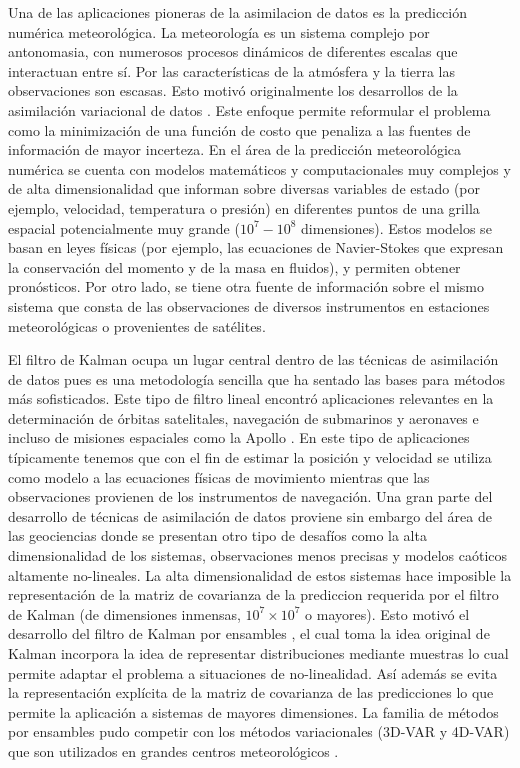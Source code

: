 Una de las aplicaciones pioneras de la asimilacion de datos es la predicción numérica meteorológica. La meteorología es un sistema complejo por antonomasia, con numerosos procesos dinámicos de diferentes escalas que interactuan entre sí. Por las características de la atmósfera y la tierra las observaciones son escasas. Esto motivó originalmente los desarrollos de la asimilación variacional de datos \citep{Talagrand1987}. Este enfoque permite reformular el problema como la minimización de una función de costo que penaliza a las fuentes de información de mayor incerteza. En el área de la predicción meteorológica numérica se cuenta con modelos matemáticos y computacionales muy complejos y de alta dimensionalidad que informan sobre diversas variables de estado (por ejemplo, velocidad, temperatura o presión) en diferentes puntos de una grilla espacial potencialmente muy grande ($10^7 - 10^8$ dimensiones). Estos modelos se basan en leyes físicas (por ejemplo, las ecuaciones de Navier-Stokes que expresan la conservación del momento y de la masa en fluidos), y permiten obtener pronósticos. Por otro lado, se tiene otra fuente de información sobre el mismo sistema que consta de las observaciones de diversos instrumentos en estaciones meteorológicas o provenientes de satélites. 

El filtro de Kalman \citep{Kalman1960, Kalman1961} ocupa un lugar central dentro de las técnicas de asimilación de datos pues es una metodología sencilla que ha sentado las bases para métodos más sofisticados. Este tipo de filtro lineal encontró aplicaciones relevantes en la determinación de órbitas satelitales, navegación de submarinos y aeronaves e incluso de misiones espaciales como la Apollo \citep{Jazwinski1970}. En este tipo de aplicaciones típicamente tenemos que con el fin de estimar la posición y velocidad se utiliza como modelo a las ecuaciones físicas de movimiento mientras que las observaciones provienen de los instrumentos de navegación. Una gran parte del desarrollo de técnicas de asimilación de datos proviene sin embargo del área de las geociencias donde se presentan otro tipo de desafíos como la alta dimensionalidad de los sistemas, observaciones menos precisas y modelos caóticos altamente no-lineales. La alta dimensionalidad de estos sistemas hace imposible la representación de la matriz de covarianza de la prediccion requerida por el filtro de Kalman (de dimensiones inmensas, $10^7 \times 10^7$ o mayores). Esto motivó el desarrollo del filtro de Kalman por ensambles \citep{Evensen1994}, el cual toma la idea original de Kalman incorpora la idea de representar distribuciones mediante muestras lo cual permite adaptar el problema a situaciones de no-linealidad. Así además se evita la representación explícita de la matriz de covarianza de las predicciones lo que permite la aplicación a sistemas de mayores dimensiones. La familia de métodos por ensambles pudo competir con los métodos variacionales (3D-VAR y 4D-VAR) que son utilizados en grandes centros meteorológicos \citep{Kalnay2007}.


